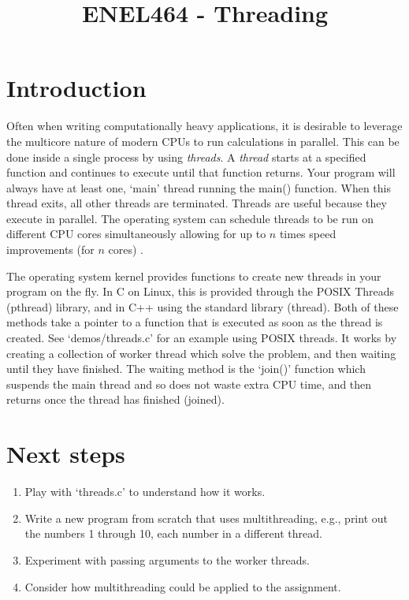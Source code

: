 \documentclass[a4paper,11pt]{article}
\begin{document}
\title{ \bf ENEL464 - Threading }
\author{}
\date{}
\maketitle


\section{Introduction}

Often when writing computationally heavy applications, it is desirable to
leverage the multicore nature of modern CPUs to run calculations in parallel.
This can be done inside a single process by using \emph{threads}. A
\emph{thread} starts at a specified function and continues to execute until that
function returns. Your program will always have at least one, `main' thread
running the main() function. When this thread exits, all other threads are
terminated. Threads are useful because they execute in parallel. The operating
system can schedule threads to be run on different CPU cores simultaneously
allowing for up to $n$ times speed improvements (for $n$ cores) \footnotemark.

The operating system kernel provides functions to create new threads in your
program on the fly. In C on Linux, this is provided through the POSIX Threads
(pthread) library, and in C++ using the standard library (thread). Both of these
methods take a pointer to a function that is executed as soon as the thread is
created. See `demos/threads.c' for an example using POSIX threads. It works by
creating a collection of worker thread which solve the problem, and then waiting
until they have finished. The waiting method is the `join()' function which
suspends the main thread and so does not waste extra CPU time, and then returns
once the thread has finished (joined).


\section{Next steps}

\begin{enumerate}
    \item Play with `threads.c' to understand how it works.
    \item Write a new program from scratch that uses multithreading,
      e.g., print out the numbers 1 through 10, each number in a
      different thread.
    \item Experiment with passing arguments to the worker threads.
    \item Consider how multithreading could be applied to the assignment.
\end{enumerate}
\end{document}
